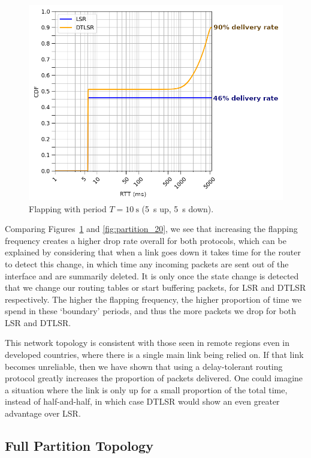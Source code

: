\documentclass[withindex,glossary,openany]{cam-thesis}
\begin{document}
\begin{figure}
  \centering
  \hspace*{2.4cm}
  \includegraphics[width=0.8\linewidth]{delay_partition_flap5}
  \caption{Flapping with period $T=\SI{10}{\s}$ (\SI{5}{\s} up, \SI{5}{\s} down).}
  \label{fig:partition_5}
\end{figure}

Comparing Figures~\ref{fig:partition_5} and \ref{fig:partition_20}, we see that increasing the flapping frequency creates a higher drop rate overall for both protocols, which can be explained by considering that when a link goes down it takes time for the router to detect this change, in which time any incoming packets are sent out of the interface and are summarily deleted. It is only once the state change is detected that we change our routing tables or start buffering packets, for LSR and DTLSR respectively. The higher the flapping frequency, the higher proportion of time we spend in these `boundary' periods, and thus the more packets we drop for both LSR and DTLSR.

This network topology is consistent with those seen in remote regions even in developed countries, where there is a single main link being relied on. If that link becomes unreliable, then we have shown that using a delay-tolerant routing protocol greatly increases the proportion of packets delivered. One could imagine a situation where the link is only up for a small proportion of the total time, instead of half-and-half, in which case DTLSR would show an even greater advantage over LSR.


\subsection{Full Partition Topology}
\end{document}
